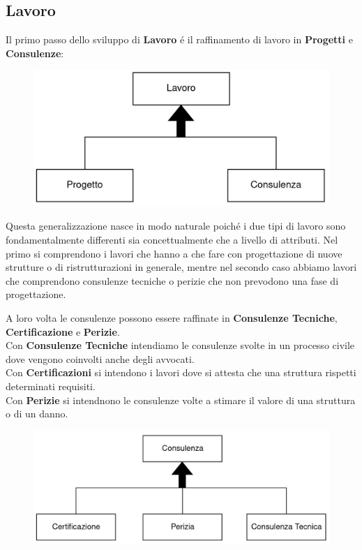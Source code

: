 \documentclass{elegantbook}
\begin{document}
            \subsection{Lavoro}
            Il primo passo dello sviluppo di \textbf{Lavoro} é il raffinamento di lavoro in \textbf{Progetti} e \textbf{Consulenze}:
            
            \begin{figure}[H]
                \includegraphics[scale=0.4]{../Img/DBSchemes/lavoro-1.png}
            \end{figure}
        
            Questa generalizzazione nasce in modo naturale poiché i due tipi di lavoro sono fondamentalmente differenti sia concettualmente che a livello di attributi. Nel primo
            si comprendono i lavori che hanno a che fare con progettazione di nuove strutture o di ristrutturazioni in generale, mentre nel secondo caso abbiamo lavori che comprendono
            consulenze tecniche o perizie che non prevodono una fase di progettazione.

            A loro volta le consulenze possono essere raffinate in \textbf{Consulenze Tecniche}, \textbf{Certificazione} e \textbf{Perizie}.\\
            Con \textbf{Consulenze Tecniche} intendiamo le consulenze svolte in un processo civile dove vengono coinvolti anche degli avvocati.\\
            Con \textbf{Certificazioni} si intendono i lavori dove si attesta che una struttura rispetti determinati requisiti.\\
            Con \textbf{Perizie} si intendnono le consulenze volte a stimare il valore di una struttura o di un danno. 

            \begin{figure}[H]
                \includegraphics[scale=0.4]{../Img/DBSchemes/lavoro-3.png} 
            \end{figure}
\end{document}
